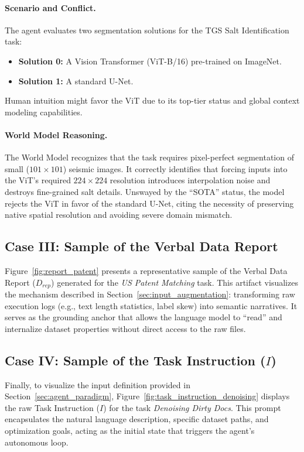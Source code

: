 \paragraph{Scenario and Conflict.}
The agent evaluates two segmentation solutions for the TGS Salt Identification task:
\begin{itemize}
    \item \textbf{Solution 0:} A Vision Transformer (ViT-B/16) pre-trained on ImageNet.
    \item \textbf{Solution 1:} A standard U-Net.
\end{itemize}
Human intuition might favor the ViT due to its top-tier status and global context modeling capabilities.

\paragraph{World Model Reasoning.}
The World Model recognizes that the task requires pixel-perfect segmentation of small ($101 \times 101$) seismic images. It correctly identifies that forcing inputs into the ViT's required $224 \times 224$ resolution introduces interpolation noise and destroys fine-grained salt details. Unswayed by the ``SOTA'' status, the model rejects the ViT in favor of the standard U-Net, citing the necessity of preserving native spatial resolution and avoiding severe domain mismatch.

\subsection{Case III: Sample of the Verbal Data Report}
\label{app:case_report}

Figure~\ref{fig:report_patent} presents a representative sample of the Verbal Data Report ($D_{rep}$) generated for the \textit{US Patent Matching} task.
This artifact visualizes the mechanism described in Section~\ref{sec:input_augmentation}: transforming raw execution logs (e.g., text length statistics, label skew) into semantic narratives.
It serves as the grounding anchor that allows the language model to ``read'' and internalize dataset properties without direct access to the raw files.

\subsection{Case IV: Sample of the Task Instruction ($I$)}
\label{app:case_instruction}

Finally, to visualize the input definition provided in Section~\ref{sec:agent_paradigm}, Figure~\ref{fig:task_instruction_denoising} displays the raw Task Instruction ($I$) for the task \textit{Denoising Dirty Docs}.
This prompt encapsulates the natural language description, specific dataset paths, and optimization goals, acting as the initial state that triggers the agent's autonomous loop.


